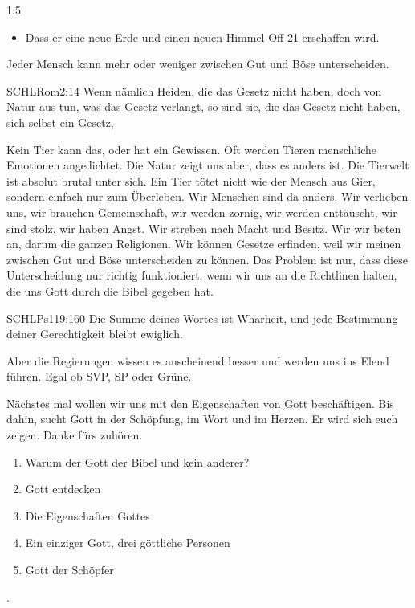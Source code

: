 \documentclass[fontsize=14pt]{../../inc/mybib}
\begin{document}
\begin{spacing}{1.5}
\begin{block}
\begin{block}
\begin{itemize}
            \item Dass er eine neue Erde und einen neuen Himmel Off 21 erschaffen wird.
        \end{itemize}       
        \end{block}
        \begin{block}
        Jeder Mensch kann mehr oder weniger zwischen Gut und Böse unterscheiden. 
        \begin{bibelbox}{SCHL}{Rom}{2:14}
        Wenn nämlich Heiden, die das Gesetz nicht haben, doch von Natur aus tun, was das Gesetz verlangt, so sind sie, die das Gesetz nicht haben, sich selbst ein Gesetz,
        \end{bibelbox}
        Kein Tier kann das, oder hat ein Gewissen. Oft werden Tieren menschliche Emotionen angedichtet. Die Natur zeigt uns aber, dass es anders ist. Die Tierwelt ist absolut brutal unter sich. Ein Tier tötet nicht wie der Mensch aus Gier, sondern einfach nur zum Überleben. Wir Menschen sind da anders. Wir verlieben uns, wir brauchen Gemeinschaft, wir werden zornig, wir werden enttäuscht, wir sind stolz, wir haben Angst. Wir streben nach Macht und Besitz. Wir wir beten an, darum die ganzen Religionen. Wir können Gesetze erfinden, weil wir meinen zwischen Gut und Böse unterscheiden zu können. Das Problem ist nur, dass diese Unterscheidung nur richtig funktioniert, wenn wir uns an die Richtlinen halten, die uns Gott durch die Bibel gegeben hat.
        \begin{bibelbox}{SCHL}{Ps}{119:160}
        Die Summe deines Wortes ist Wharheit, und jede Bestimmung deiner Gerechtigkeit bleibt ewiglich.
        \end{bibelbox}
        Aber die Regierungen wissen es anscheinend besser und werden uns ins Elend führen. Egal ob SVP, SP oder Grüne.

       \end{block}

       Nächstes mal wollen wir uns mit den Eigenschaften von Gott beschäftigen. Bis dahin, sucht Gott in der Schöpfung, im Wort und im Herzen. Er wird sich euch zeigen. Danke fürs zuhören.
        \begin{enumerate}
            \item Warum der Gott der Bibel und kein anderer?
            \item Gott entdecken
            \item Die Eigenschaften Gottes
            \item Ein einziger Gott, drei göttliche Personen
            \item Gott der Schöpfer
        \end{enumerate}      
    
    \end{block}
    .
\end{spacing}
\end{document}
